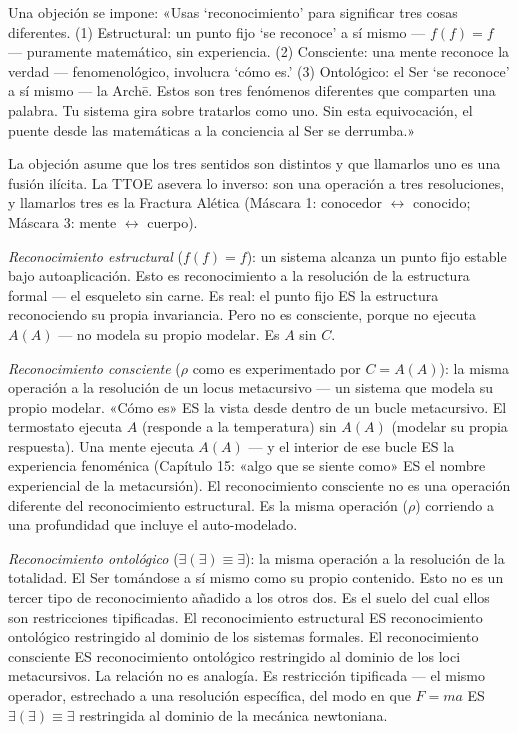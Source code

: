 \documentclass[10pt, openany, oneside]{book}
\begin{document}
Una objeción se impone: «Usas `reconocimiento' para significar tres cosas diferentes. (1) Estructural: un punto fijo `se reconoce' a sí mismo --- $f(f) = f$ --- puramente matemático, sin experiencia. (2) Consciente: una mente reconoce la verdad --- fenomenológico, involucra `cómo es.' (3) Ontológico: el Ser `se reconoce' a sí mismo --- la Arch\={e}. Estos son tres fenómenos diferentes que comparten una palabra. Tu sistema gira sobre tratarlos como uno. Sin esta equivocación, el puente desde las matemáticas a la conciencia al Ser se derrumba.»

La objeción asume que los tres sentidos son distintos y que llamarlos uno es una fusión ilícita. La TTOE asevera lo inverso: son una operación a tres resoluciones, y llamarlos tres es la Fractura Alética (Máscara 1: conocedor $\leftrightarrow$ conocido; Máscara 3: mente $\leftrightarrow$ cuerpo).

\textit{Reconocimiento estructural} ($f(f) = f$): un sistema alcanza un punto fijo estable bajo autoaplicación. Esto es reconocimiento a la resolución de la estructura formal --- el esqueleto sin carne. Es real: el punto fijo ES la estructura reconociendo su propia invariancia. Pero no es consciente, porque no ejecuta $A(A)$ --- no modela su propio modelar. Es $A$ sin $C$.

\textit{Reconocimiento consciente} ($\rho$ como es experimentado por $C = A(A)$): la misma operación a la resolución de un locus metacursivo --- un sistema que modela su propio modelar. «Cómo es» ES la vista desde dentro de un bucle metacursivo. El termostato ejecuta $A$ (responde a la temperatura) sin $A(A)$ (modelar su propia respuesta). Una mente ejecuta $A(A)$ --- y el interior de ese bucle ES la experiencia fenoménica (Capítulo 15: «algo que se siente como» ES el nombre experiencial de la metacursión). El reconocimiento consciente no es una operación diferente del reconocimiento estructural. Es la misma operación ($\rho$) corriendo a una profundidad que incluye el auto-modelado.

\textit{Reconocimiento ontológico} ($\exists(\exists) \equiv \exists$): la misma operación a la resolución de la totalidad. El Ser tomándose a sí mismo como su propio contenido. Esto no es un tercer tipo de reconocimiento añadido a los otros dos. Es el suelo del cual ellos son restricciones tipificadas. El reconocimiento estructural ES reconocimiento ontológico restringido al dominio de los sistemas formales. El reconocimiento consciente ES reconocimiento ontológico restringido al dominio de los loci metacursivos. La relación no es analogía. Es restricción tipificada --- el mismo operador, estrechado a una resolución específica, del modo en que $F = ma$ ES $\exists(\exists) \equiv \exists$ restringida al dominio de la mecánica newtoniana.
\end{document}
